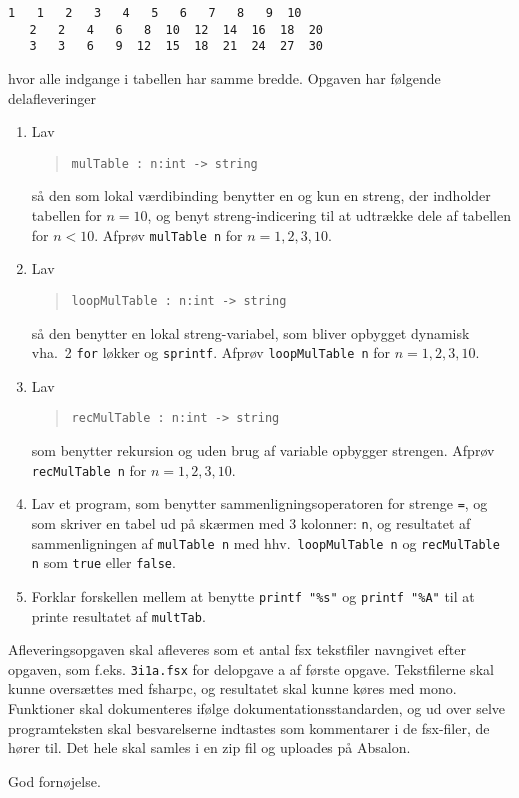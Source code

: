 \documentclass[a4paper,12pt]{article}
\begin{document}
\begin{enumerate}[label=3i.\arabic*,start=0]
\begin{lstlisting}[caption=Example of use and output from \lstinline!mulTab!,label=mulTab]
   1   1   2   3   4   5   6   7   8   9  10
   2   2   4   6   8  10  12  14  16  18  20
   3   3   6   9  12  15  18  21  24  27  30
\end{lstlisting}
  hvor alle indgange i tabellen har samme bredde. Opgaven har følgende delafleveringer
  \begin{enumerate}
  \item Lav
    \begin{quote}
      \mbox{\lstinline!mulTable : n:int -> string!}
    \end{quote}
så den som lokal værdibinding benytter en og kun en streng, der indholder tabellen for $n=10$, og benyt streng-indicering til at udtrække dele af tabellen for $n<10$.  Afprøv \mbox{\lstinline!mulTable n!} for $n= 1, 2, 3, 10$.
  \item Lav
    \begin{quote}
      \mbox{\lstinline!loopMulTable : n:int -> string!}
    \end{quote}
så den benytter en lokal streng-variabel, som bliver opbygget dynamisk vha.\ 2 \lstinline!for! løkker og \lstinline!sprintf!.  Afprøv \mbox{\lstinline!loopMulTable n!} for $n= 1, 2, 3, 10$.
  \item Lav
    \begin{quote}
      \mbox{\lstinline!recMulTable : n:int -> string!}
    \end{quote}
som benytter rekursion og uden brug af variable opbygger strengen. Afprøv \mbox{\lstinline!recMulTable n!} for $n= 1, 2, 3, 10$.
  \item Lav et program, som benytter sammenligningsoperatoren for strenge \lstinline!=!, og som skriver en tabel ud på skærmen med 3 kolonner: \lstinline!n!, og resultatet af sammenligningen af \mbox{\lstinline!mulTable n!} med hhv.\ \mbox{\lstinline!loopMulTable n!} og \mbox{\lstinline!recMulTable n!} som \lstinline!true! eller \lstinline!false!.
  \item Forklar forskellen mellem at benytte \lstinline!printf "%s"! og \lstinline!printf "%A"! til at printe resultatet af \lstinline!multTab!.
  \end{enumerate}
\end{enumerate}
Afleveringsopgaven skal afleveres som et antal fsx tekstfiler navngivet efter opgaven, som f.eks. \lstinline!3i1a.fsx! for delopgave a af første opgave. Tekstfilerne skal kunne oversættes med fsharpc, og resultatet skal kunne køres med mono. Funktioner skal dokumenteres ifølge dokumentationsstandarden, og ud over selve programteksten skal besvarelserne indtastes som kommentarer i de fsx-filer, de hører til. Det hele skal samles i en zip fil og uploades på Absalon.

\flushright God fornøjelse.
\end{document}
